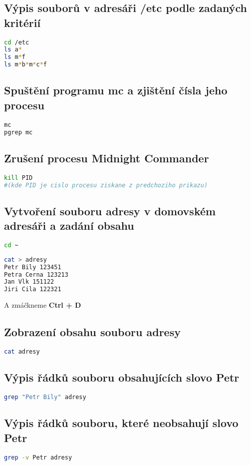 \documentclass{article}
\begin{document}
\subsection{Výpis souborů v adresáři /etc podle zadaných kritérií}
\begin{lstlisting}[language=bash]
cd /etc
ls a*
ls m*f
ls m*b*m*c*f
\end{lstlisting}
\subsection{Spuštění programu mc a zjištění čísla jeho procesu}
\begin{lstlisting}[language=bash]
mc
pgrep mc
\end{lstlisting}
\subsection{Zrušení procesu Midnight Commander}
\begin{lstlisting}[language=bash]
kill PID 
#(kde PID je cislo procesu ziskane z predchoziho prikazu)
\end{lstlisting}
\subsection{Vytvoření souboru adresy v domovském adresáři a zadání obsahu}
\begin{lstlisting}[language=bash]
cd ~
\end{lstlisting}
\begin{lstlisting}[language=bash]
cat > adresy
Petr Bily 123451
Petra Cerna 123213
Jan Vlk 151122
Jiri Cila 122321
\end{lstlisting}
A zmáčkneme \textbf{Ctrl + D}
\subsection{Zobrazení obsahu souboru adresy}
\begin{lstlisting}[language=bash]
cat adresy
\end{lstlisting}
\subsection{Výpis řádků souboru obsahujících slovo \textbf{Petr}}
\begin{lstlisting}[language=bash]
grep "Petr Bily" adresy
\end{lstlisting}
\subsection{Výpis řádků souboru, které neobsahují slovo \textbf{Petr}}
\begin{lstlisting}[language=bash]
grep -v Petr adresy
\end{lstlisting}
\end{document}
